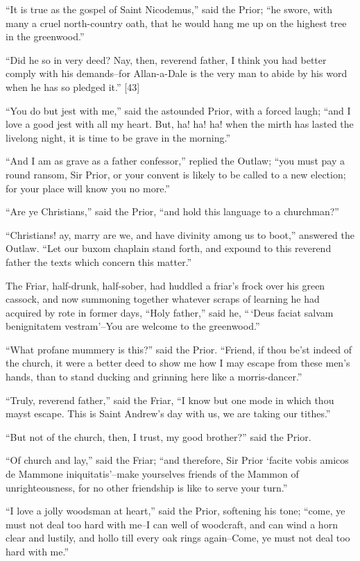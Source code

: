 ``It is true as the gospel of Saint Nicodemus,'' said the Prior; ``he
swore, with many a cruel north-country oath, that he would hang me up on
the highest tree in the greenwood.''

``Did he so in very deed? Nay, then, reverend father, I think you had
better comply with his demands--for Allan-a-Dale is the very man to
abide by his word when he has so pledged it.'' {[}43{]}

``You do but jest with me,'' said the astounded Prior, with a forced
laugh; ``and I love a good jest with all my heart. But, ha! ha! ha! when
the mirth has lasted the livelong night, it is time to be grave in the
morning.''

``And I am as grave as a father confessor,'' replied the Outlaw; ``you
must pay a round ransom, Sir Prior, or your convent is likely to be
called to a new election; for your place will know you no more.''

``Are ye Christians,'' said the Prior, ``and hold this language to a
churchman?''

``Christians! ay, marry are we, and have divinity among us to boot,''
answered the Outlaw. ``Let our buxom chaplain stand forth, and expound
to this reverend father the texts which concern this matter.''

The Friar, half-drunk, half-sober, had huddled a friar's frock over his
green cassock, and now summoning together whatever scraps of learning he
had acquired by rote in former days, ``Holy father,'' said he, ``\,`Deus
faciat salvam benignitatem vestram'--You are welcome to the greenwood.''

``What profane mummery is this?'' said the Prior. ``Friend, if thou
be'st indeed of the church, it were a better deed to show me how I may
escape from these men's hands, than to stand ducking and grinning here
like a morris-dancer.''

``Truly, reverend father,'' said the Friar, ``I know but one mode in
which thou mayst escape. This is Saint Andrew's day with us, we are
taking our tithes.''

``But not of the church, then, I trust, my good brother?'' said the
Prior.

``Of church and lay,'' said the Friar; ``and therefore, Sir Prior
`facite vobis amicos de Mammone iniquitatis'--make yourselves friends of
the Mammon of unrighteousness, for no other friendship is like to serve
your turn.''

``I love a jolly woodsman at heart,'' said the Prior, softening his
tone; ``come, ye must not deal too hard with me--I can well of
woodcraft, and can wind a horn clear and lustily, and hollo till every
oak rings again--Come, ye must not deal too hard with me.''

